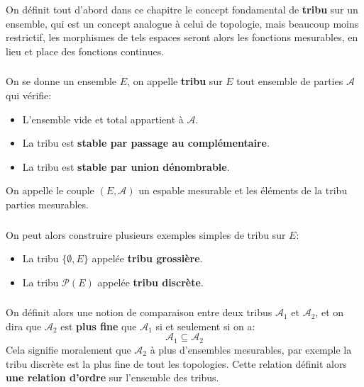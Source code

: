 \chapter*{} %
On définit tout d'abord dans ce chapitre le concept fondamental de \textbf{tribu} sur un ensemble, qui est un concept analogue à celui de topologie, mais beaucoup moins restrictif, les morphismes de tels espaces seront alors les fonctions mesurables, en lieu et place des fonctions continues.

\subsection*{}
On se donne un ensemble \(E\), on appelle \textbf{tribu} sur \(E\) tout ensemble de parties \(\mathcal{A}\) qui vérifie:
\begin{itemize}
   \item L'ensemble vide et total appartient à \(\mathcal{A}\).
   \item La tribu est \textbf{stable par passage au complémentaire}.
   \item La tribu est \textbf{stable par union dénombrable}.
\end{itemize}
On appelle le couple \((E, \mathcal{A})\) un espable mesurable et les éléments de la tribu parties mesurables.

\subsection*{}
On peut alors construire plusieurs exemples simples de tribu sur \(E\):
\begin{itemize}
   \item La tribu \(\{\emptyset, E\}\) appelée \textbf{tribu grossière}.
   \item La tribu \(\mathcal{P}(E)\) appelée \textbf{tribu discrète}.
\end{itemize}

\subsection*{}
On définit alors une notion de comparaison entre deux tribus \(\mathcal{A}_1\) et \(\mathcal{A}_2\), et on dira que \(\mathcal{A}_2\) est \textbf{plus fine} que \(\mathcal{A}_1\) si et seulement si on a:
\[
   \mathcal{A}_1 \subseteq \mathcal{A}_2
\]
Cela signifie moralement que \(\mathcal{A}_2\) à plus d'ensembles mesurables, par exemple la tribu discrète est la plus fine de tout les topologies. Cette relation définit alors \textbf{une relation d'ordre} sur l'ensemble des tribus.

